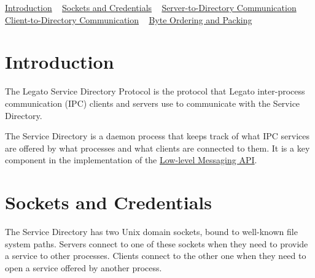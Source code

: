 \hyperlink{serviceDirectoryProtocol_serviceDirectoryProtocol_Intro}{Introduction} ~\newline
 \hyperlink{serviceDirectoryProtocol_serviceDirectoryProtocol_SocketsAndCredentials}{Sockets and Credentials} ~\newline
 \hyperlink{serviceDirectoryProtocol_serviceDirectoryProtocol_Servers}{Server-\/to-\/\+Directory Communication} ~\newline
 \hyperlink{serviceDirectoryProtocol_serviceDirectoryProtocol_Clients}{Client-\/to-\/\+Directory Communication} ~\newline
 \hyperlink{serviceDirectoryProtocol_serviceDirectoryProtocol_Packing}{Byte Ordering and Packing}\hypertarget{serviceDirectoryProtocol_serviceDirectoryProtocol_Intro}{}\section{Introduction}\label{serviceDirectoryProtocol_serviceDirectoryProtocol_Intro}
The Legato Service Directory Protocol is the protocol that Legato inter-\/process communication (I\+PC) clients and servers use to communicate with the Service Directory.

The Service Directory is a daemon process that keeps track of what I\+PC services are offered by what processes and what clients are connected to them. It is a key component in the implementation of the \hyperlink{c_messaging}{Low-\/level Messaging A\+PI}.\hypertarget{serviceDirectoryProtocol_serviceDirectoryProtocol_SocketsAndCredentials}{}\section{Sockets and Credentials}\label{serviceDirectoryProtocol_serviceDirectoryProtocol_SocketsAndCredentials}
The Service Directory has two Unix domain sockets, bound to well-\/known file system paths. Servers connect to one of these sockets when they need to provide a service to other processes. Clients connect to the other one when they need to open a service offered by another process.

